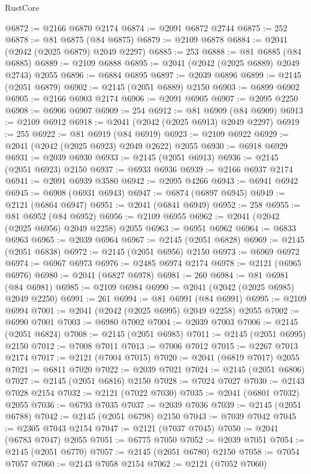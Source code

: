 \begin{lexlean}{RustCore}
\begin{coremodule}
@6872 := @2166 @6870 @2174
@6874 := @2091 @6872 @2744
@6875 := 252
@6878 := @81 @6875 (@84 @6875)
@6879 := @2109 @6878
@6884 := @2041 (@2042 (@2025 @6879) @2049 @2297)
@6885 := 253
@6888 := @81 @6885 (@84 @6885)
@6889 := @2109 @6888
@6895 := @2041 (@2042 (@2025 @6889) @2049 @2743) @2055
@6896 := @6884 @6895
@6897 := @2039 @6896
@6899 := @2145 (@2051 @6879)
@6902 := @2145 (@2051 @6889) @2150
@6903 := @6899 @6902
@6905 := @2166 @6903 @2174
@6906 := @2091 @6905
@6907 := @2095 @2250
@6908 := @6906 @6907
@6909 := 254
@6912 := @81 @6909 (@84 @6909)
@6913 := @2109 @6912
@6918 := @2041 (@2042 (@2025 @6913) @2049 @2297)
@6919 := 255
@6922 := @81 @6919 (@84 @6919)
@6923 := @2109 @6922
@6929 := @2041 (@2042 (@2025 @6923) @2049 @2622) @2055
@6930 := @6918 @6929
@6931 := @2039 @6930
@6933 := @2145 (@2051 @6913)
@6936 := @2145 (@2051 @6923) @2150
@6937 := @6933 @6936
@6939 := @2166 @6937 @2174
@6941 := @2091 @6939 @3580
@6942 := @2095 @4266
@6943 := @6941 @6942
@6945 := @6908 (@6931 @6943)
@6947 := @6874 (@6897 @6945)
@6949 := @2121 (@6864 @6947)
@6951 := @2041 (@6841 @6949)
@6952 := 258
@6955 := @81 @6952 (@84 @6952)
@6956 := @2109 @6955
@6962 := @2041 (@2042 (@2025 @6956) @2049 @2258) @2055
@6963 := @6951 @6962
@6964 := @6833 @6963
@6965 := @2039 @6964
@6967 := @2145 (@2051 @6828)
@6969 := @2145 (@2051 @6838)
@6972 := @2145 (@2051 @6956) @2150
@6973 := @6969 @6972
@6974 := @6967 @6973
@6976 := @2485 @6974 @2174
@6978 := @2121 (@6965 @6976)
@6980 := @2041 (@6827 @6978)
@6981 := 260
@6984 := @81 @6981 (@84 @6981)
@6985 := @2109 @6984
@6990 := @2041 (@2042 (@2025 @6985) @2049 @2250)
@6991 := 261
@6994 := @81 @6991 (@84 @6991)
@6995 := @2109 @6994
@7001 := @2041 (@2042 (@2025 @6995) @2049 @2258) @2055
@7002 := @6990 @7001
@7003 := @6980 @7002
@7004 := @2039 @7003
@7006 := @2145 (@2051 @6824)
@7008 := @2145 (@2051 @6985)
@7011 := @2145 (@2051 @6995) @2150
@7012 := @7008 @7011
@7013 := @7006 @7012
@7015 := @2267 @7013 @2174
@7017 := @2121 (@7004 @7015)
@7020 := @2041 (@6819 @7017) @2055
@7021 := @6811 @7020
@7022 := @2039 @7021
@7024 := @2145 (@2051 @6806)
@7027 := @2145 (@2051 @6816) @2150
@7028 := @7024 @7027
@7030 := @2143 @7028 @2154
@7032 := @2121 (@7022 @7030)
@7035 := @2041 (@6801 @7032) @2055
@7036 := @6793 @7035
@7037 := @2039 @7036
@7039 := @2145 (@2051 @6788)
@7042 := @2145 (@2051 @6798) @2150
@7043 := @7039 @7042
@7045 := @2305 @7043 @2154
@7047 := @2121 (@7037 @7045)
@7050 := @2041 (@6783 @7047) @2055
@7051 := @6775 @7050
@7052 := @2039 @7051
@7054 := @2145 (@2051 @6770)
@7057 := @2145 (@2051 @6780) @2150
@7058 := @7054 @7057
@7060 := @2143 @7058 @2154
@7062 := @2121 (@7052 @7060)

\end{coremodule}
\end{lexlean}
